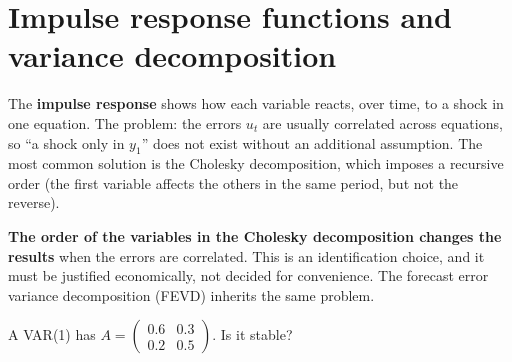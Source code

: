 \section{Impulse response functions and variance decomposition}
The \textbf{impulse response} shows how each variable reacts, over time, to a shock in one equation. The problem: the errors $u_t$ are usually correlated across equations, so ``a shock only in $y_1$'' does not exist without an additional assumption. The most common solution is the Cholesky decomposition, which imposes a recursive order (the first variable affects the others in the same period, but not the reverse).

\begin{atencao}
\textbf{The order of the variables in the Cholesky decomposition changes the results} when the errors are correlated. This is an identification choice, and it must be justified economically, not decided for convenience. The forecast error variance decomposition (FEVD) inherits the same problem.
\end{atencao}

\begin{exercicio}
A VAR(1) has $A=\begin{pmatrix}0.6&0.3\\0.2&0.5\end{pmatrix}$. Is it stable?
\end{exercicio}
